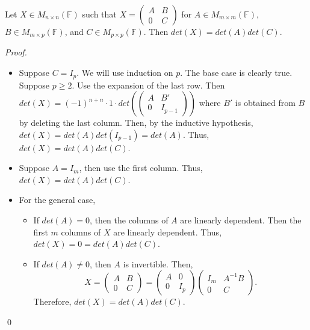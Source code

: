 \documentclass[12pt]{article}
\newenvironment{lemma}[2][Lemma]{\begin{trivlist}
\item[\hskip \labelsep {\bfseries #1}\hskip \labelsep {\bfseries #2.}]}{\end{trivlist}}
\newenvironment{sol}
    {\emph{Proof.}
    }
    {
    \qed
    }
\begin{document}
\begin{lemma}{8}
Let $X \in M_{n \times n}(\mathbb{F})$ such that $X = \begin{pmatrix}
A & B \\ 0 & C
\end{pmatrix}$ for $A \in M_{m \times m}(\mathbb{F})$, $B \in M_{m \times p}(\mathbb{F})$, and $C \in M_{p \times p}(\mathbb{F})$. Then $det(X) = det(A)det(C)$.
\end{lemma}

\begin{sol}
\begin{itemize}
    \item Suppose $C = I_p$. We will use induction on $p$. The base case is clearly true. Suppose $p \geq 2$. Use the expansion of the last row. Then $det(X) = (-1)^{n + n} \cdot 1 \cdot det\left( \begin{pmatrix}
    A & B' \\ 0 & I_{p-1}
    \end{pmatrix} \right)$ where $B'$ is obtained from $B$ by deleting the last column. Then, by the inductive hypothesis, $det(X) = det(A)det(I_{p-1}) = det(A)$. Thus, $det(X) = det(A)det(C)$.
    
    \item Suppose $A = I_m$, then use the first column. Thus, $det(X) = det(A)det(C)$.
    
    \item For the general case, 
    \begin{itemize}
        \item If $det(A) = 0$, then the columns of $A$ are linearly dependent. Then the first $m$ columns of $X$ are linearly dependent. Thus, $det(X) = 0 = det(A)det(C)$.
        
        \item If $det(A) \neq 0$, then $A$ is invertible. Then, $$X = \begin{pmatrix}
        A & B \\ 0 & C
        \end{pmatrix} = \begin{pmatrix}
        A & 0 \\ 0 & I_p
        \end{pmatrix}\begin{pmatrix}
        I_m & A^{-1}B \\ 0 & C
        \end{pmatrix}.$$ Therefore, $det(X) = det(A)det(C)$.
    \end{itemize}
\end{itemize}
\end{sol}
\end{document}
